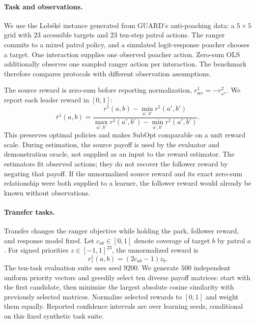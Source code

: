 \paragraph{Task and observations.}
We use the Lob\'ek\'e instance generated from GUARD's anti-poaching data: a
$5\times5$ grid with $23$ accessible targets and $23$ ten-step patrol actions.
The ranger commits to a mixed patrol policy, and a simulated logit-response
poacher chooses a target. One interaction supplies one observed poacher action.
Zero-sum OLS additionally observes one sampled ranger action per interaction.
The benchmark therefore compares protocols with different observation assumptions.

The source reward is zero-sum before reporting normalization,
$r^1_{\mathrm{src}}=-r^2_{\omega^\star}$. We report each leader reward in $[0,1]$:
\begin{equation*}
\bar r^1(a,b)=\frac{r^1(a,b)-\min_{a',b'}r^1(a',b')}{\max_{a',b'}r^1(a',b')-\min_{a',b'}r^1(a',b')}.
\end{equation*}
This preserves optimal policies and makes SubOpt comparable on a unit reward scale.
During estimation, the source payoff is used by the evaluator and demonstration
oracle, not supplied as an input to the reward estimator. The estimators fit
observed actions; they do not recover the follower reward by negating that payoff. If the unnormalized source reward and
its exact zero-sum relationship were both supplied to a learner, the follower
reward would already be known without observations.

\paragraph{Transfer tasks.}
Transfer changes the ranger objective while holding the park, follower reward,
and response model fixed. Let $c_{ab}\in[0,1]$ denote coverage of target $b$ by
patrol $a$. For signed priorities $z\in[-1,1]^{23}$, the unnormalized reward is
\begin{equation*}
r^1_z(a,b)=(2c_{ab}-1)z_b.
\end{equation*}
The ten-task evaluation suite uses seed $9200$. We generate $500$ independent
uniform priority vectors and greedily select ten diverse payoff matrices:
start with the first candidate, then minimize the largest absolute cosine
similarity with previously selected matrices. Normalize selected rewards to
$[0,1]$ and weight them equally. Reported confidence intervals are over learning
seeds, conditional on this fixed synthetic task suite.

